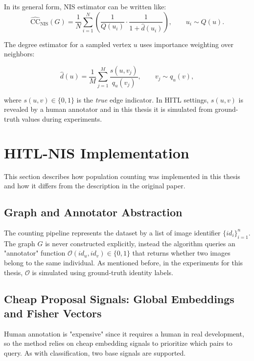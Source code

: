 In its general form, NIS estimator can be written like:
\begin{equation}
\widehat{\mathrm{CC}}_{\mathrm{NIS}}(G)=
\frac{1}{N}\sum_{i=1}^{N}
\left(
\frac{1}{Q(u_i)}\cdot
\frac{1}{1+\widehat{d}(u_i)}
\right),
\qquad u_i\sim Q(u).
\label{eq:nis_estimator}
\end{equation}

The degree estimator for a sampled vertex \(u\) uses importance weighting over neighbors:

\begin{equation}
\widehat{d}(u)=\frac{1}{M}\sum_{j=1}^{M}\frac{s(u,v_j)}{q_u(v_j)},
\qquad v_j\sim q_u(v),
\label{eq:degree_estimator}
\end{equation}


where \(s(u,v)\in\{0,1\}\) is the \emph{true} edge indicator.
 In HITL settings, \(s(u,v)\) is revealed by a human annotator and in this thesis it is 
 simulated from ground-truth values during experiments.


\section{HITL-NIS Implementation}
\label{sec:counting_implementation}

This section describes how population counting was implemented in this thesis and how it differs from the description in the original paper.

\subsection{Graph and Annotator Abstraction}
The counting pipeline represents the dataset by a list of image identifier \(\{id_i\}_{i=1}^{n}\). The graph \(G\) is never constructed explicitly, instead the algorithm queries an "annotator" function \(\mathcal{O}(id_u,id_v)\in\{0,1\}\) that returns whether two images belong to the same individual. As mentioned before, in the experiments for this thesis, \(\mathcal{O}\) is simulated using ground-truth identity labels.

\subsection{Cheap Proposal Signals: Global Embeddings and Fisher Vectors}
\label{sec:counting_signals}

Human annotation is "expensive" since it requires a human in real development, so the method relies on cheap embedding signals to prioritize which pairs to query. As with classification, two base signals are supported.

